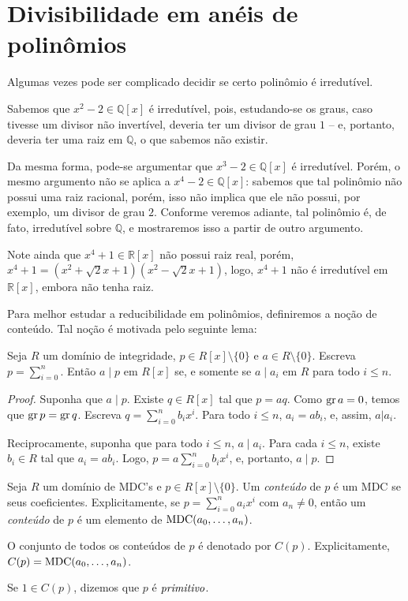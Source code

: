 \section{Divisibilidade em anéis de polinômios}
    Algumas vezes pode ser complicado decidir se certo polinômio é irredutível.

    Sabemos que $x^2-2\in \mathbb Q[x]$ é irredutível, pois, estudando-se os graus, caso tivesse um divisor não invertível, deveria ter um divisor de grau $1$ -- e, portanto, deveria ter uma raiz em $\mathbb Q$, o que sabemos não existir.

    Da mesma forma, pode-se argumentar que $x^3-2\in \mathbb Q[x]$ é irredutível. Porém, o mesmo argumento não se aplica a $x^4-2\in \mathbb Q[x]$: sabemos que tal polinômio não possui uma raiz racional, porém, isso não implica que ele não possui, por exemplo, um divisor de grau $2$.
    Conforme veremos adiante, tal polinômio é, de fato, irredutível sobre $\mathbb Q$, e mostraremos isso a partir de outro argumento.

    Note ainda que $x^4+1\in \mathbb R[x]$ não possui raiz real, porém, $x^4+1=(x^2+\sqrt 2 x+1)(x^2-\sqrt 2 x+1)$, logo, $x^4+1$ não é irredutível em $\mathbb R[x]$, embora não tenha raiz.

    Para melhor estudar a reducibilidade em polinômios, definiremos a noção de conteúdo. Tal noção é motivada pelo seguinte lema:

    \begin{lemma}
    Seja $R$ um domínio de integridade, $p \in R[x]\setminus \{0\}$ e $a \in R\setminus \{0\}$. Escreva $p=\sum_{i=0}^n$. Então $a\mid p$ em $R[x]$ se, e somente se $a\mid a_i$ em $R$ para todo $i\leq n$.
    \end{lemma}
    \begin{proof}
        Suponha que $a\mid p$. Existe $q\in R[x]$ tal que $p=aq$. Como $\operatorname{gr} a=0$, temos que $\operatorname{gr} p=\operatorname{gr} q$. Escreva $q=\sum_{i=0}^n b_i x^i$. Para todo $i\leq n$, $a_i=ab_i$, e, assim, $a|a_i$.
        
        Reciprocamente, suponha que para todo $i\leq n$, $a\mid a_i$. Para cada $i\leq n$, existe $b_i \in R$ tal que $a_i=ab_i$. Logo, $p=a\sum_{i=0}^n b_i x^i$, e, portanto, $a\mid p$.
    \end{proof}

    \begin{definition}
        Seja $R$ um domínio de MDC's e $p \in R[x]\setminus \{0\}$. Um \emph{conteúdo} de $p$ é um MDC se seus coeficientes. Explicitamente, se $p=\sum_{i=0}^n a_i x^i$ com $a_n\neq 0$, então um \emph{conteúdo} de $p$ é um elemento de $\operatorname{MDC}(a_0, \dots, a_n)$.

        O conjunto de todos os conteúdos de $p$ é denotado por $C(p)$.
        Explicitamente, $C(p)=\operatorname{MDC}(a_0, \dots, a_n)$.

        Se $1 \in C(p)$, dizemos que $p$ é $\emph{primitivo}$.
    \end{definition}

